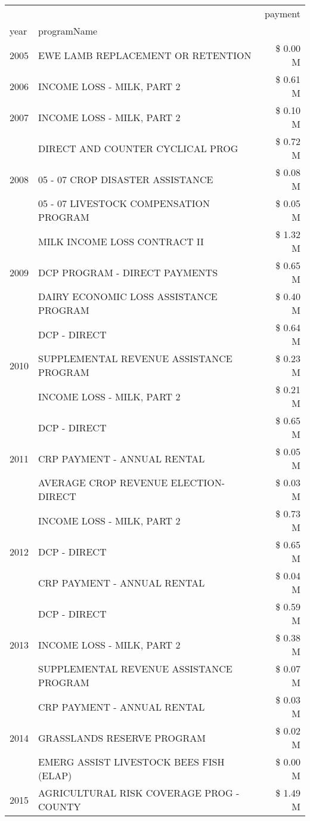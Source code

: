 \begin{tabular}{llr}
\toprule
 &  & payment \\
year & programName &  \\
\midrule
2005 & EWE LAMB REPLACEMENT OR RETENTION & \$ 0.00 M \\
\cline{1-3}
2006 & INCOME LOSS - MILK, PART 2 & \$ 0.61 M \\
\cline{1-3}
2007 & INCOME LOSS - MILK, PART 2 & \$ 0.10 M \\
\cline{1-3}
\multirow[t]{3}{*}{2008} & DIRECT AND COUNTER CYCLICAL PROG & \$ 0.72 M \\
 & 05 - 07 CROP DISASTER ASSISTANCE & \$ 0.08 M \\
 & 05 - 07 LIVESTOCK COMPENSATION PROGRAM & \$ 0.05 M \\
\cline{1-3}
\multirow[t]{3}{*}{2009} & MILK INCOME LOSS CONTRACT II & \$ 1.32 M \\
 & DCP PROGRAM - DIRECT PAYMENTS & \$ 0.65 M \\
 & DAIRY ECONOMIC LOSS ASSISTANCE PROGRAM & \$ 0.40 M \\
\cline{1-3}
\multirow[t]{3}{*}{2010} & DCP - DIRECT & \$ 0.64 M \\
 & SUPPLEMENTAL REVENUE ASSISTANCE PROGRAM & \$ 0.23 M \\
 & INCOME LOSS - MILK, PART 2 & \$ 0.21 M \\
\cline{1-3}
\multirow[t]{3}{*}{2011} & DCP - DIRECT & \$ 0.65 M \\
 & CRP PAYMENT - ANNUAL RENTAL & \$ 0.05 M \\
 & AVERAGE CROP REVENUE ELECTION-DIRECT & \$ 0.03 M \\
\cline{1-3}
\multirow[t]{3}{*}{2012} & INCOME LOSS - MILK, PART 2 & \$ 0.73 M \\
 & DCP - DIRECT & \$ 0.65 M \\
 & CRP PAYMENT - ANNUAL RENTAL & \$ 0.04 M \\
\cline{1-3}
\multirow[t]{3}{*}{2013} & DCP - DIRECT & \$ 0.59 M \\
 & INCOME LOSS - MILK, PART 2 & \$ 0.38 M \\
 & SUPPLEMENTAL REVENUE ASSISTANCE PROGRAM & \$ 0.07 M \\
\cline{1-3}
\multirow[t]{3}{*}{2014} & CRP PAYMENT - ANNUAL RENTAL & \$ 0.03 M \\
 & GRASSLANDS RESERVE PROGRAM & \$ 0.02 M \\
 & EMERG ASSIST LIVESTOCK BEES FISH (ELAP) & \$ 0.00 M \\
\cline{1-3}
\multirow[t]{3}{*}{2015} & AGRICULTURAL RISK COVERAGE PROG - COUNTY & \$ 1.49 M \\

\end{tabular}
